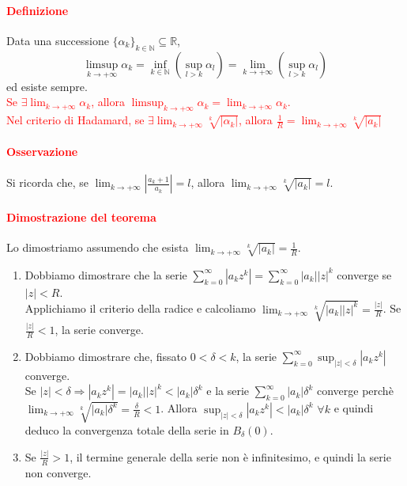 \documentclass{article}
\newcommand{\R}{\mathbb{R}}
\newcommand{\N}{\mathbb{N}}
\begin{document}
\paragraph{\textcolor{red}{Definizione}}
Data una successione $\{\alpha_k\}_{k\in\N}\subseteq \R$, 
\begin{equation*}
    \limsup_{k\rightarrow+\infty} \alpha_k=\inf_{k\in\N}\left(\sup_{l>k} \alpha_l\right)=\lim_{k \rightarrow+\infty}\left(\sup_{l>k}\alpha_l\right)
\end{equation*}
ed esiste sempre.\\
\textcolor{red}{Se $\exists \lim_{k\rightarrow+\infty}\alpha_k$, allora $\limsup_{k\rightarrow+\infty}\alpha_k=\lim_{k\rightarrow+\infty}\alpha_k$.\\ Nel criterio di Hadamard, se $\exists \lim_{k\rightarrow+\infty}\sqrt[k]{|\alpha_k|}$, allora $\frac{1}{R}=\lim_{k\rightarrow+\infty}\sqrt[k]{|a_k|}$}

\paragraph{\textcolor{red}{Osservazione}}
Si ricorda che, se $\lim_{k\rightarrow+\infty}|\frac{a_k+1}{a_k}|=l$, allora $\lim_{k\rightarrow+\infty}\sqrt[k]{|a_k|}=l$.

\paragraph{\textcolor{red}{Dimostrazione del teorema}}
Lo dimostriamo assumendo che esista $\lim_{k\rightarrow+\infty}\sqrt[k]{|a_k|}=\frac{1}{R}$.
\begin{enumerate}
    \item Dobbiamo dimostrare che la serie $\sum_{k=0}^{\infty}|a_kz^k|=\sum_{k=0}^{\infty}|a_k||z|^k$ converge se $|z|<R$.\\ Applichiamo il criterio della radice e calcoliamo $\lim_{k \rightarrow+\infty}\sqrt[k]{|a_k||z|^k}=\frac{|z|}{R}$. Se $\frac{|z|}{R}<1$, la serie converge.
    \item Dobbiamo dimostrare che, fissato $0<\delta<k$, la serie $\sum_{k=0}^{\infty}\sup_{|z|<\delta} |a_kz^k|$ converge.\\ Se $|z|<\delta \Rightarrow |a_kz^k|=|a_k||z|^k<|a_k|\delta^k$ e la serie $\sum_{k=0}^{\infty}|a_k|\delta^k$ converge perchè $\lim_{k \rightarrow+\infty} \sqrt[k]{|a_k|\delta^k}=\frac{\delta}{R}<1$. Allora $\sup_{|z|<\delta}|a_kz^k|<|a_k|\delta^k\,\, \forall k$ e quindi deduco la convergenza totale della serie in $B_{\delta}(0)$.
    \item Se $\frac{|z|}{R}>1$, il termine generale della serie non è infinitesimo, e quindi la serie non converge.
\end{enumerate}
\end{document}
